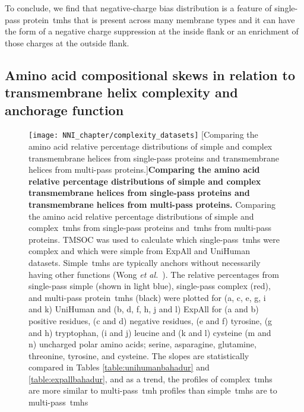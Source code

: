 To conclude, we find that negative-charge bias distribution is a feature of single\--pass protein~\gls{tmh}s that is present across many membrane types and it can have the form of a negative charge suppression at the inside flank or an enrichment of those charges at the outside flank.

\subsection{Amino acid compositional skews in relation to transmembrane helix complexity and anchorage function}

\begin{figure}[p]
\centering
\texttt{[image: NNI\_chapter/complexity\_datasets]}
[Comparing the amino acid relative percentage distributions of simple and complex transmembrane helices from single\--pass proteins and transmembrane helices from multi\--pass proteins.]{\textbf{Comparing the amino acid relative percentage distributions of simple and complex transmembrane helices from single\--pass proteins and transmembrane helices from multi\--pass proteins.} Comparing the amino acid relative percentage distributions of simple and complex~\gls{tmh}s from single\--pass proteins and~\gls{tmh}s from multi\--pass proteins.
TMSOC was used to calculate which single\--pass~\gls{tmh}s were complex and which were simple from ExpAll and UniHuman datasets.
Simple~\gls{tmh}s are typically anchors without necessarily having other functions (Wong \textit{et al.}~\cite{Wong2010}).
The relative percentages from single\--pass simple (shown in light blue), single\--pass complex (red), and multi\--pass protein~\gls{tmh}s (black) were plotted for (a, c, e, g, i and k) UniHuman and (b, d, f, h, j and l) ExpAll for (a and b) positive residues, (c and d) negative residues, (e and f) tyrosine, (g and h) tryptophan, (i and j) leucine and (k and l) cysteine (m and n) uncharged polar amino acids; serine, asparagine, glutamine, threonine, tyrosine, and cysteine.
The slopes are statistically compared in Tables \ref{table:unihumanbahadur} and \ref{table:expallbahadur}, and as a trend, the profiles of complex~\gls{tmh}s are more similar to multi\--pass~\gls{tmh} profiles than simple~\gls{tmh}s are to multi\--pass~\gls{tmh}s}

\label{fig:complexity_datasets}
\end{figure}


